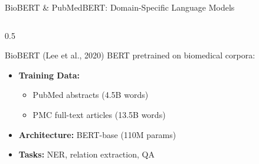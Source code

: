 \documentclass[aspectratio=169]{beamer}
\begin{document}
\begin{frame}{BioBERT \& PubMedBERT: Domain-Specific Language Models}
    \begin{columns}
        \begin{column}{0.5\textwidth}
            \begin{block}{BioBERT (Lee et al., 2020)}
                BERT pretrained on biomedical corpora:
                \begin{itemize}
                    \item \textbf{Training Data:}
                    \begin{itemize}
                        \item PubMed abstracts (4.5B words)
                        \item PMC full-text articles (13.5B words)
                    \end{itemize}
                    \item \textbf{Architecture:} BERT-base (110M params)
                    \item \textbf{Tasks:} NER, relation extraction, QA
                \end{itemize}
            \end{block}
            

\end{column}
\end{columns}
\end{frame}
\end{document}
